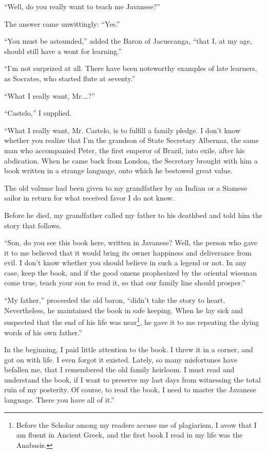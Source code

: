 \documentclass[a4paper,12pt]{book}
\begin{document}
``Well, do you really want to teach me Javanese?''

The answer came unwittingly: ``Yes.''

``You must be astounded,'' added the Baron
of Jacuecanga, ``that I, at my age, should
still have a wont for learning.''

``I'm not surprized at all. There have been
noteworthy examples of late learners,
as Socrates, who started flute at seventy.''

``What I really want, Mr.\ldots?''

``Castelo,'' I supplied.

``What I really want, Mr. Castelo,
is to fulfill a family pledge.
I don't know whether you realize that I'm the
grandson of State Secretary Albernaz, the same
man who accompanied Peter,
the first emperor of Brazil,
into exile, after his abdication.
When he came back from London,
the Secretary brought with him a book written in a strange
language, onto which he bestowed great value.

The old volume had been given to my grandfather
by an Indian or a Siamese sailor in
return for what received favor I do not know.

Before he died, my grandfather called
my father to his deathbed and told him
the story that follows.

``Son, do you see this book here, written in Javanese?
Well, the person who
gave it to me believed that it would bring its owner
happiness and deliverance from evil. I don't know
whether you should believe in such a legend or not.
In any case, keep the book, and if
the good omens prophesized by the oriental wiseman
come true, teach your son to read it,
so that our family line should prosper.''

``My father,'' proceeded the old baron, ``didn't take
the story to heart. Nevertheless, he maintained
the book in safe keeping.
When he lay sick and suspected that the end of his
life was near\footnote{Before the Scholar among
my readers accuse me of plagiarism,
I avow that I am fluent in Ancient Greek,
and the first book I read in my life
was the Anabasis.},
he gave it to me repeating the
dying words of his own father.''

In the beginning, I 
paid little attention to the book. I threw it 
in a corner, and got on with life.
I even forgot it existed. Lately,
so many misfortunes have befallen me,
that I remembered the old family heirloom.
I must read and understand the book, if I want to
preserve my last days from witnessing the total
ruin of my posterity. Of course, to read the book,
I need to master the Javanese language.
There you have all of it.''
\end{document}

